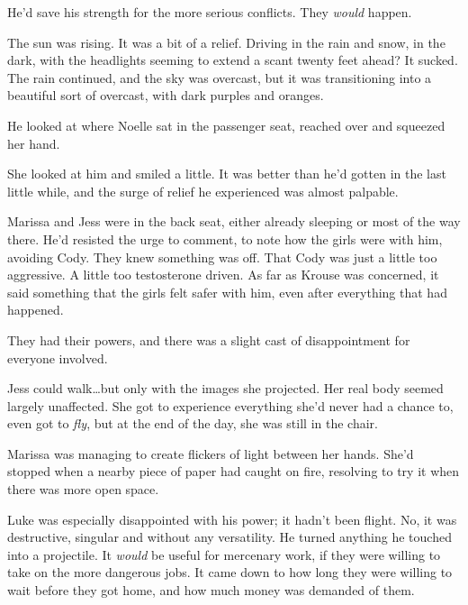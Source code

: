 He'd save his strength for the more serious conflicts.  They \emph{would} happen.



The sun was rising.  It was a bit of a relief.  Driving in the rain and snow, in the dark, with the headlights seeming to extend a scant twenty feet ahead?  It sucked.  The rain continued, and the sky was overcast, but it was transitioning into a beautiful sort of overcast, with dark purples and oranges.



He looked at where Noelle sat in the passenger seat, reached over and squeezed her hand.



She looked at him and smiled a little.  It was better than he'd gotten in the last little while, and the surge of relief he experienced was almost palpable.



Marissa and Jess were in the back seat, either already sleeping or most of the way there.  He'd resisted the urge to comment, to note how the girls were with him, avoiding Cody.  They knew something was off.  That Cody was just a little too aggressive.  A little too testosterone driven.  As far as Krouse was concerned, it said something that the girls felt safer with him, even after everything that had happened.



They had their powers, and there was a slight cast of disappointment for everyone involved.



Jess could walk\ldots but only with the images she projected.  Her real body seemed largely unaffected.  She got to experience everything she'd never had a chance to, even got to \emph{fly}, but at the end of the day, she was still in the chair.



Marissa was managing to create flickers of light between her hands.  She'd stopped when a nearby piece of paper had caught on fire, resolving to try it when there was more open space.



Luke was especially disappointed with his power; it hadn't been flight.  No, it was destructive, singular and without any versatility.  He turned anything he touched into a projectile.  It \emph{would} be useful for mercenary work, if they were willing to take on the more dangerous jobs.  It came down to how long they were willing to wait before they got home, and how much money was demanded of them.



